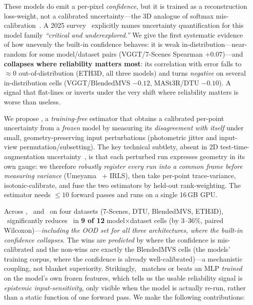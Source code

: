 These models do emit a per-pixel \emph{confidence}, but it is trained as a reconstruction
loss-weight, not a calibrated uncertainty---the 3D analogue of softmax mis-calibration~\cite{guo}.
A 2025 survey~\cite{survey3d} explicitly names uncertainty quantification for this model family
\emph{``critical and underexplored.''} We give the first systematic evidence of how unevenly the
built-in confidence behaves: it is weak in-distribution---near-random for some model/dataset pairs
(VGGT/7-Scenes Spearman $+0.07$)---and \textbf{collapses where reliability matters most}: its
correlation with error falls to $\approx0$ out-of-distribution (ETH3D, all three models) and turns
\emph{negative} on several in-distribution cells (VGGT/BlendedMVS $-0.12$, MASt3R/DTU $-0.10$). A
signal that flat-lines or inverts under the very shift where reliability matters is worse than useless.

We propose \trustr, a \emph{training-free} estimator that obtains a calibrated per-point
uncertainty from a \emph{frozen} model by measuring its \emph{disagreement with itself} under
small, geometry-preserving input perturbations (photometric jitter and input-view
permutation/subsetting). The key technical subtlety, absent in 2D test-time-augmentation
uncertainty~\cite{ayhan,ttaaleatoric}, is that each perturbed run expresses geometry in its own
gauge: we therefore \emph{robustly register every run into a common frame before measuring
variance} (Umeyama~\cite{umeyama} + IRLS), then take per-point trace-variance, isotonic-calibrate,
and fuse the two estimators by held-out rank-weighting. The estimator needs $\le 10$ forward
passes and runs on a single 16\,GB GPU.

Across \vggt, \pii\ and \mastr\ on four datasets (7-Scenes, DTU, BlendedMVS, ETH3D), \trustr\
significantly reduces \ause\ in \textbf{9 of 12} model$\times$dataset cells (by $3\text{--}36\%$,
paired Wilcoxon)---\emph{including the OOD set for all three architectures, where the built-in
confidence collapses}. The wins are \emph{predicted} by where the confidence is mis-calibrated and
the non-wins are exactly the BlendedMVS cells (the models' training corpus, where the confidence is
already well-calibrated)---a mechanistic coupling, not blanket superiority.
Strikingly, \trustr\ matches or beats an MLP \emph{trained} on the model's own frozen features,
which tells us the usable reliability signal is \emph{epistemic input-sensitivity}, only visible
when the model is actually re-run, rather than a static function of one forward pass. We make the
following contributions:

